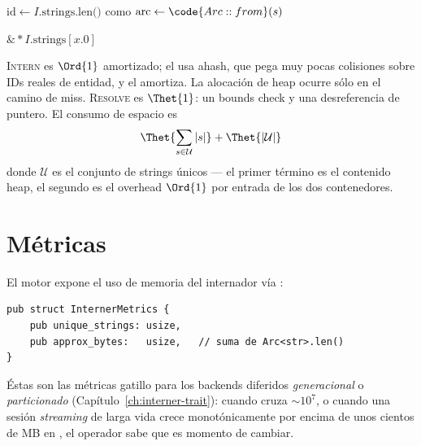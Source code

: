 \begin{algorithm}
\caption{\textsc{Intern}}\label{alg:intern}
$\text{id} \gets I.\text{strings.len()}$ como \;
$\text{arc} \gets \code{Arc::from}(s)$
\Return {}\;
\end{algorithm}

\begin{algorithm}
\caption{\textsc{Resolve}}\label{alg:resolve}
\Return $\&* I.\text{strings}[x.0]$\;
\end{algorithm}

\begin{complexity}
\textsc{Intern} es $\Ord{1}$ amortizado; el  usa
ahash, que pega muy pocas colisiones sobre IDs reales de
entidad, y el  amortiza. La alocación de heap
ocurre sólo en el camino de miss. \textsc{Resolve} es $\Thet{1}$:
un bounds check y una desreferencia de puntero. El consumo de
espacio es
\[
    \Thet{\sum_{s \in \mathcal{U}} |s|} + \Thet{|\mathcal{U}|}
\]
donde $\mathcal{U}$ es el conjunto de strings únicos --- el
primer término es el contenido heap, el segundo es el overhead
$\Ord{1}$ por entrada de los dos contenedores.
\end{complexity}

\section{Métricas}

El motor expone el uso de memoria del internador vía
:

\begin{lstlisting}[style=rust]
pub struct InternerMetrics {
    pub unique_strings: usize,
    pub approx_bytes:   usize,   // suma de Arc<str>.len()
}
\end{lstlisting}

Éstas son las métricas gatillo para los backends diferidos
\emph{generacional} o \emph{particionado}
(Capítulo~\ref{ch:interner-trait}): cuando 
cruza $\sim$$10^7$, o cuando una sesión \emph{streaming} de larga
vida crece monotónicamente por encima de unos cientos de MB en
, el operador sabe que es momento de
cambiar.

